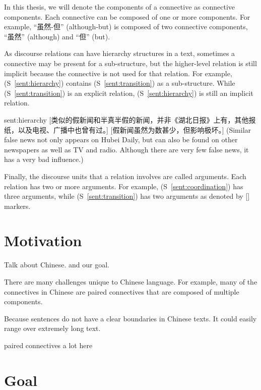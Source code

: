 In this thesis, we will denote the components of a connective as connective components.
Each connective can be composed of one or more components. For example, ``虽然-但'' (although-but)
is composed of two connective components, ``虽然'' (although) and ``但'' (but).

As discourse relations can have hierarchy structures in a text, sometimes a connective may be
present for a sub-structure, but the higher-level relation is still implicit because the connective
is not used for that relation. For example, (S~\ref{sent:hierarchy}) contains (S~\ref{sent:transition})
as a sub-structure. While (S~\ref{sent:transition}) is an explicit relation, (S~\ref{sent:hierarchy})
is still an implicit relation.

\begin{sent}{sent:hierarchy}{}
    [类似的假新闻和半真半假的新闻，并非《湖北日报》上有，其他报纸，以及电视、广播中也曾有过。]
    [假新闻虽然为数甚少，但影响极坏。]
    (Similar false news not only appears on Hubei Daily, but can also be found on
    other newspapers as well as TV and radio.
    Although there are very few false news, it has a very bad influence.)
\end{sent}

Finally, the discourse units that a relation involves are called arguments. Each relation
has two or more arguments. For example, (S~\ref{sent:coordination}) has three arguments, while
(S~\ref{sent:transition}) has two arguments as denoted by [] markers.


%
%
\section{Motivation}

Talk about Chinese. and our goal.

There are many challenges unique to Chinese language. For example, many of the connectives
in Chinese are paired connectives that are composed of multiple components.

Because sentences do not have a clear boundaries in Chinese texts. It could easily range
over extremely long text.

paired connectives a lot here \citep{zhou2012pdtb}


%
%
\section{Goal}

